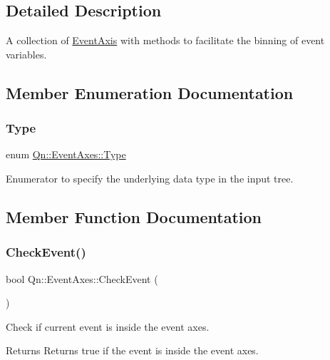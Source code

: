 \subsection{Detailed Description}
A collection of \mbox{\hyperlink{classQn_1_1EventAxis}{Event\+Axis}} with methods to facilitate the binning of event variables. 

\subsection{Member Enumeration Documentation}
\mbox{\label{classQn_1_1EventAxes_a81ebc6649920a462e33c176287b8706c}} 
\subsubsection{\texorpdfstring{Type}{Type}}
{\footnotesize\ttfamily enum \mbox{\hyperlink{classQn_1_1EventAxes_a81ebc6649920a462e33c176287b8706c}{Qn\+::\+Event\+Axes\+::\+Type}}\hspace{0.3cm}{\ttfamily [strong]}}

Enumerator to specify the underlying data type in the input tree. 

\subsection{Member Function Documentation}
\mbox{\label{classQn_1_1EventAxes_a979183927f0ded4af0b1b22385550c2a}} 
\subsubsection{\texorpdfstring{Check\+Event()}{CheckEvent()}}
{\footnotesize\ttfamily bool Qn\+::\+Event\+Axes\+::\+Check\+Event (\begin{DoxyParamCaption}{ }\end{DoxyParamCaption})\hspace{0.3cm}{\ttfamily [inline]}}



Check if current event is inside the event axes. 

\begin{DoxyReturn}{Returns}
Returns true if the event is inside the event axes. 
\end{DoxyReturn}
\mbox{\label{classQn_1_1EventAxes_a784b89dd78c0fe3a0fe6c57ef0835c23}} 
